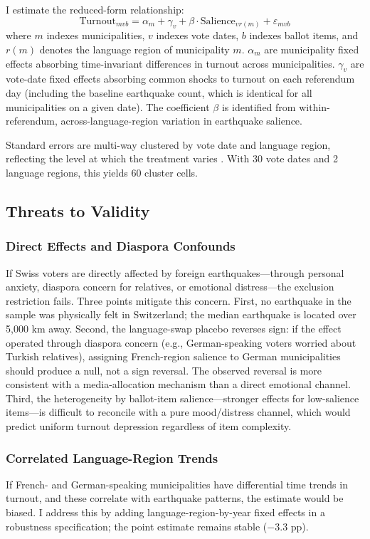 \documentclass[12pt]{article}
\begin{document}
I estimate the reduced-form relationship:
\begin{equation}
\text{Turnout}_{mvb} = \alpha_m + \gamma_v + \beta \cdot \text{Salience}_{vr(m)} + \varepsilon_{mvb}
\label{eq:main}
\end{equation}
where $m$ indexes municipalities, $v$ indexes vote dates, $b$ indexes ballot items, and $r(m)$ denotes the language region of municipality $m$. $\alpha_m$ are municipality fixed effects absorbing time-invariant differences in turnout across municipalities. $\gamma_v$ are vote-date fixed effects absorbing common shocks to turnout on each referendum day (including the baseline earthquake count, which is identical for all municipalities on a given date). The coefficient $\beta$ is identified from within-referendum, across-language-region variation in earthquake salience.

Standard errors are multi-way clustered by vote date and language region, reflecting the level at which the treatment varies \citep{cameron2011robust}. With 30 vote dates and 2 language regions, this yields 60 cluster cells.

\subsection{Threats to Validity}

\subsubsection*{Direct Effects and Diaspora Confounds} If Swiss voters are directly affected by foreign earthquakes---through personal anxiety, diaspora concern for relatives, or emotional distress---the exclusion restriction fails. Three points mitigate this concern. First, no earthquake in the sample was physically felt in Switzerland; the median earthquake is located over 5,000 km away. Second, the language-swap placebo reverses sign: if the effect operated through diaspora concern (e.g., German-speaking voters worried about Turkish relatives), assigning French-region salience to German municipalities should produce a null, not a sign reversal. The observed reversal is more consistent with a media-allocation mechanism than a direct emotional channel. Third, the heterogeneity by ballot-item salience---stronger effects for low-salience items---is difficult to reconcile with a pure mood/distress channel, which would predict uniform turnout depression regardless of item complexity.

\subsubsection*{Correlated Language-Region Trends} If French- and German-speaking municipalities have differential time trends in turnout, and these correlate with earthquake patterns, the estimate would be biased. I address this by adding language-region-by-year fixed effects in a robustness specification; the point estimate remains stable ($-3.3$ pp).
\end{document}
